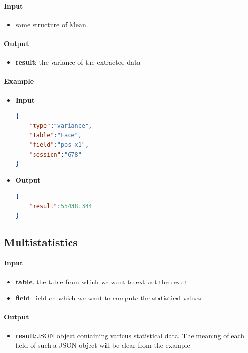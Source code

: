 \documentclass[a4paper,notitlepage,onecolumn]{hitec}  %
\begin{document}
\paragraph{Input}
\begin{itemize}
\item same structure of Mean.
\end{itemize}

\paragraph{Output}
\begin{itemize}
\item\textbf{result}: the variance of the extracted data
\end{itemize}

\paragraph{Example}
\begin{itemize}
\item\textbf{Input}
\begin{lstlisting}[language=json,firstnumber=1]
{  
	"type":"variance",
	"table":"Face",
	"field":"pos_x1",
	"session":"678"
}
\end{lstlisting}
\item\textbf{Output}
\begin{lstlisting}[language=json,firstnumber=1]
{  
	"result":55438.344
}
\end{lstlisting}
\end{itemize}

\subsection{Multistatistics}

\paragraph{Input}
\begin{itemize}
\item\textbf{table}: the table from which we want to extract the result
\item\textbf{field}: field on which we want to compute the statistical values
\end{itemize}

\paragraph{Output}
\begin{itemize}
\item\textbf{result}:JSON object containing various statistical data. The meaning of each field of such a JSON object will be clear from the example
\end{itemize}
\end{document}
